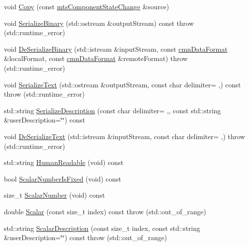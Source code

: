 \begin{DoxyCompactItemize}
void \hyperlink{classmts_component_state_change_a3f4f3ab445dc09120b3021d1ae8fc895}{Copy} (const \hyperlink{classmts_component_state_change}{mts\+Component\+State\+Change} \&source)
\item 
void \hyperlink{classmts_component_state_change_a9d47989b56c5f09d4c5f45f1233be08f}{Serialize\+Binary} (std\+::ostream \&output\+Stream) const   throw (std\+::runtime\+\_\+error)
\item 
void \hyperlink{classmts_component_state_change_a94fcb305f49b48544d9622b5ba548994}{De\+Serialize\+Binary} (std\+::istream \&input\+Stream, const \hyperlink{classcmn_data_format}{cmn\+Data\+Format} \&local\+Format, const \hyperlink{classcmn_data_format}{cmn\+Data\+Format} \&remote\+Format)  throw (std\+::runtime\+\_\+error)
\item 
void \hyperlink{classmts_component_state_change_a5870510b594ed315dd9670f57e12ffa7}{Serialize\+Text} (std\+::ostream \&output\+Stream, const char delimiter= \textquotesingle{},\textquotesingle{}) const   throw (std\+::runtime\+\_\+error)
\item 
std\+::string \hyperlink{classmts_component_state_change_ac3189b3b0a8729f2e2d306d1a61c368c}{Serialize\+Description} (const char delimiter= \textquotesingle{},\textquotesingle{}, const std\+::string \&user\+Description=\char`\"{}\char`\"{}) const 
\item 
void \hyperlink{classmts_component_state_change_a77324cfbd0d3ff54e5bbf83019f1d758}{De\+Serialize\+Text} (std\+::istream \&input\+Stream, const char delimiter= \textquotesingle{},\textquotesingle{})  throw (std\+::runtime\+\_\+error)
\item 
std\+::string \hyperlink{classmts_component_state_change_a0ae5594a59ccaa29c1d87cfa33a46e5f}{Human\+Readable} (void) const 
\item 
bool \hyperlink{classmts_component_state_change_aae2cdd8a44b6f58b4f0edb74aca68768}{Scalar\+Number\+Is\+Fixed} (void) const 
\item 
size\+\_\+t \hyperlink{classmts_component_state_change_a6bda338fada7251b74162d39db441c4e}{Scalar\+Number} (void) const 
\item 
double \hyperlink{classmts_component_state_change_ac12605fd78c373df55481fb12cded439}{Scalar} (const size\+\_\+t index) const   throw (std\+::out\+\_\+of\+\_\+range)
\item 
std\+::string \hyperlink{classmts_component_state_change_ae11813b368512c2cf58398319b9e2850}{Scalar\+Description} (const size\+\_\+t index, const std\+::string \&user\+Description=\char`\"{}\char`\"{}) const   throw (std\+::out\+\_\+of\+\_\+range)
\end{DoxyCompactItemize}
